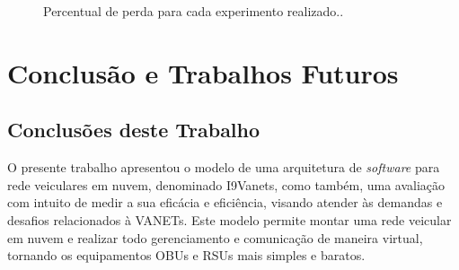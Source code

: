 \documentclass[
	12pt,				%
	oneside,			%
	a4paper,			%
	english,			%
	brazil				%
	]{abntex2ppgsi}
\begin{document}
\begin{figure}[h!]
	\caption{Percentual de perda para cada experimento realizado..}
	\centering
	\label{fig:graficoperda}
\end{figure}  

\chapter{Conclusão e Trabalhos Futuros}\label{sec:conclusao}

\section{Conclusões deste Trabalho}
O presente trabalho apresentou o modelo de uma arquitetura de \textit{software} para rede veiculares em nuvem, denominado I9Vanets, como também, uma avaliação com intuito de medir a sua eficácia e eficiência, visando atender às demandas e desafios relacionados à VANETs. Este modelo permite montar uma rede veicular em nuvem e realizar todo gerenciamento e comunicação de maneira virtual, tornando os equipamentos OBUs e RSUs mais simples e baratos.
\end{document}
